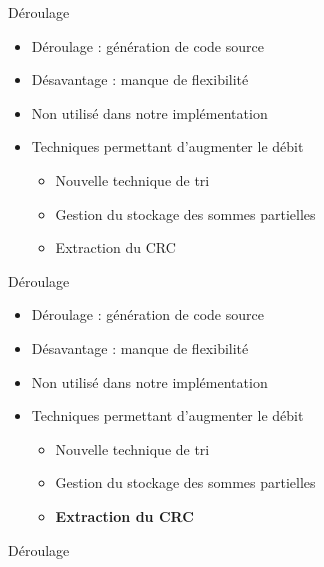 \documentclass[t,compress,mathserif,12pt,xcolor=dvipsnames]{beamer}
\begin{document}
\begin{frame}[c]{Déroulage}
\begin{itemize}
	\item Déroulage : génération de code source
	\item Désavantage : manque de flexibilité
	\item Non utilisé dans notre implémentation
	\item Techniques permettant d'augmenter le débit
	\begin{itemize}
		\item Nouvelle technique de tri
		\item Gestion du stockage des sommes partielles
		\item Extraction du CRC
	\end{itemize}
\end{itemize}
\end{frame}


\begin{frame}[c]{Déroulage}
\begin{itemize}
	\item Déroulage : génération de code source
	\item Désavantage : manque de flexibilité
	\item Non utilisé dans notre implémentation
	\item Techniques permettant d'augmenter le débit
	\begin{itemize}
		\item Nouvelle technique de tri
		\item Gestion du stockage des sommes partielles
		\item \textbf{Extraction du CRC}
	\end{itemize}
\end{itemize}
\end{frame}

\begin{frame}[c]{Déroulage}
	\centering
\end{frame}
\end{document}
